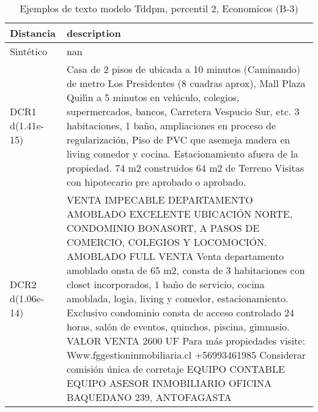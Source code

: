\begin{table}[H]
\centering
\fontsize{10}{14}\selectfont
\caption{Ejemplos de texto modelo Tddpm, percentil 2, Economicos (B-3)}
\label{table-example-economicos-b-3-tddpm_mlp-2p-text}
\begin{tabular}{|l|m{35em}|}
\hline
\rowcolor[gray]{0.8}
Distancia & description \\
\hline Sintético & nan \\
\hline DCR1 d(1.41e-15) & Casa de 2 pisos de ubicada a 10 minutos (Caminando) de metro Los Presidentes (8 cuadras aprox), Mall Plaza Quil{\'\i}n a 5 minutos en veh{\'\i}culo, colegios, supermercados, bancos, Carretera Vespucio Sur, etc.  3 habitaciones, 1 ba\~no, ampliaciones en proceso de regularizaci\'on, Piso de PVC que asemeja madera en living comedor y cocina. Estacionamiento afuera de la propiedad.  74 m2 construidos 64 m2 de Terreno  Visitas con hipotecario pre aprobado o aprobado. \\
\hline DCR2 d(1.06e-14) & VENTA IMPECABLE DEPARTAMENTO AMOBLADO EXCELENTE UBICACI\'ON NORTE, CONDOMINIO BONASORT, A PASOS DE COMERCIO, COLEGIOS Y LOCOMOCI\'ON. AMOBLADO FULL VENTA Venta departamento amoblado onsta de 65 m2, consta de 3 habitaciones con closet incorporados, 1 ba\~no de servicio, cocina amoblada, logia, living y comedor, estacionamiento. Exclusivo condominio consta de acceso controlado 24 horas, sal\'on de eventos, quinchos, piscina, gimnasio. VALOR VENTA 2600 UF Para m\'as propiedades visite: Www.fggestioninmobiliaria.cl +56993461985 Considerar comisi\'on \'unica de corretaje EQUIPO CONTABLE EQUIPO ASESOR INMOBILIARIO OFICINA BAQUEDANO 239, ANTOFAGASTA \\
\hline
\end{tabular}
\end{table}
